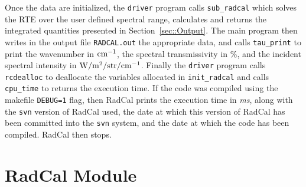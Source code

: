Once the data are initialized, the \verb=driver= program calls \verb=sub_radcal= which solves the RTE over the user defined spectral range, calculates and returns the integrated quantities presented in Section~\ref{sec::Output}. The main program then writes in the output file \verb=RADCAL.out= the appropriate data, and calls \verb=tau_print= to print the wavenumber in $\rm cm^{-1}$, the spectral transmissivity in \%, and the incident spectral intensity in $\rm W/m^{2}/str/cm^{-1}$.
Finally the \verb=driver= program calls \verb=rcdealloc= to deallocate the variables allocated in \verb=init_radcal= and calls \verb=cpu_time= to returns the execution time. If the code was compiled using the makefile \verb-DEBUG=1- flag, then RadCal prints the execution time in \textit{ms}, along with the \verb=svn= version of RadCal used, the date at which this version of RadCal has been committed into the \verb=svn= system, and the date at which the code has been compiled. RadCal then stops.

\section{RadCal Module}

